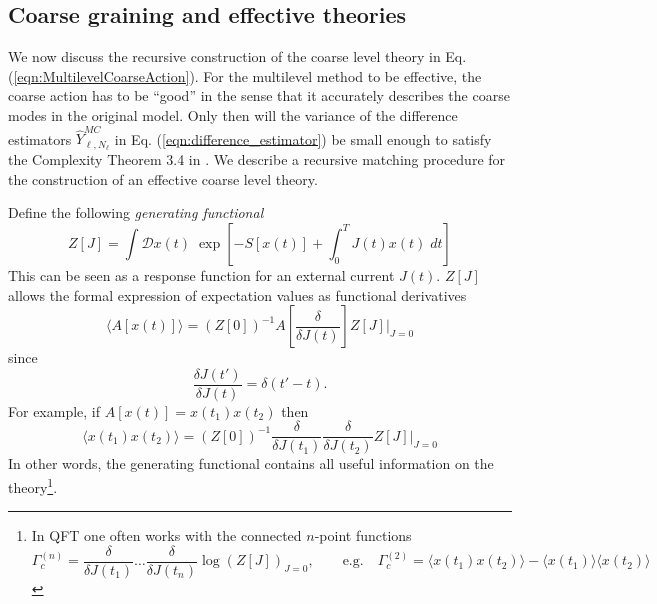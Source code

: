\documentclass[11pt]{article}
\begin{document}
\subsection{Coarse graining and effective theories}\label{sec:coarse_graining}
We now discuss the recursive construction of the coarse level theory in Eq. (\ref{eqn:MultilevelCoarseAction}). For the multilevel method to be effective, the coarse action has to be ``good'' in the sense that it accurately describes the coarse modes in the original model. Only then will the variance of the difference estimators $\hat{Y}^{MC}_{\ell,N_\ell}$ in Eq. (\ref{eqn:difference_estimator}) be small enough to satisfy the Complexity Theorem 3.4 in \cite{Dodwell2015}. We describe a recursive matching procedure for the construction of an effective coarse level theory.

Define the following \textit{generating functional}
\begin{equation}
  Z[J] = \int \mathcal{D}x(t)\;\exp\left[-S[x(t)]+\int_0^T J(t)x(t)\;dt \right]\label{eqn:generating_functional_cont}
\end{equation}
This can be seen as a response function for an external current $J(t)$.
$Z[J]$ allows the formal expression of expectation values as functional derivatives
\begin{equation}
\langle A[x(t)] \rangle = (Z[0])^{-1}A\left[\frac{\delta}{\delta J(t)}\right] Z[J]\Big|_{J=0}
\end{equation}
since
\begin{equation}
\frac{\delta J(t')}{\delta J(t)} = \delta(t'-t).
\end{equation}
For example, if $A[x(t)]=x(t_1)x(t_2)$ then
\begin{equation}
\langle x(t_1)x(t_2)\rangle = (Z[0])^{-1} \frac{\delta}{\delta J(t_1)}
\frac{\delta}{\delta J(t_2)} Z[J]\Big|_{J=0}
\end{equation}
In other words, the generating functional contains all useful information on the theory\footnote{In QFT one often works with the connected $n$-point functions
\begin{equation}
  \Gamma_c^{(n)} = \frac{\delta}{\delta J(t_1)}\dots\frac{\delta}{\delta J(t_n)} \log\left(Z[J]\right)_{J=0},\qquad\text{e.g.}\quad\Gamma_c^{(2)} = \langle x(t_1)x(t_2)\rangle-\langle x(t_1)\rangle\langle x(t_2)\rangle
\end{equation}}.
\end{document}
